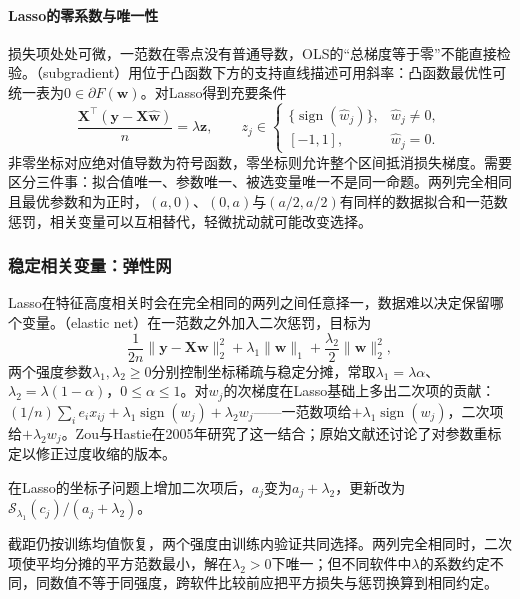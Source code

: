 \paragraph{Lasso的零系数与唯一性}

损失项处处可微，一范数在零点没有普通导数，OLS的“总梯度等于零”不能直接检验。（subgradient）用位于凸函数下方的支持直线描述可用斜率：凸函数最优性可统一表为$0\in\partial F(\bm{w})$。对Lasso得到充要条件
\begin{equation}
  \frac{\bm{X}^{\top}(\bm{y}-\bm{X}\widehat{\bm{w}})}{n}
  =\lambda\bm{z},\qquad
  z_j\in
  \begin{cases}
    \{\operatorname{sign}(\widehat w_j)\},&\widehat w_j\ne0,\\
    [-1,1],&\widehat w_j=0.
  \end{cases}
  \label{eq:regression-lasso-kkt}
\end{equation}
非零坐标对应绝对值导数为符号函数，零坐标则允许整个区间抵消损失梯度。需要区分三件事：拟合值唯一、参数唯一、被选变量唯一不是同一命题。两列完全相同且最优参数和为正时，$(a,0)$、$(0,a)$与$(a/2,a/2)$有同样的数据拟合和一范数惩罚，相关变量可以互相替代，轻微扰动就可能改变选择。

\subsubsection{稳定相关变量：弹性网}
\label{sec:regression-elastic-net}

Lasso在特征高度相关时会在完全相同的两列之间任意择一，数据难以决定保留哪个变量。（elastic net）在一范数之外加入二次惩罚，目标为
\[
  \frac{1}{2n}\lVert\bm{y}-\bm{X}\bm{w}\rVert_2^2
  +\lambda_1\lVert\bm{w}\rVert_1
  +\frac{\lambda_2}{2}\lVert\bm{w}\rVert_2^2,
\]
两个强度参数$\lambda_1,\lambda_2\geq0$分别控制坐标稀疏与稳定分摊，常取$\lambda_1=\lambda\alpha$、$\lambda_2=\lambda(1-\alpha)$，$0\leq\alpha\leq1$。对$w_j$的次梯度在Lasso基础上多出二次项的贡献：$(1/n)\sum_i e_i x_{ij}+\lambda_1\operatorname{sign}(w_j)+\lambda_2 w_j$——一范数项给$+\lambda_1\operatorname{sign}(w_j)$，二次项给$+\lambda_2 w_j$。Zou与Hastie在2005年研究了这一结合；原始文献还讨论了对参数重标定以修正过度收缩的版本。

在Lasso的坐标子问题上增加二次项后，$a_j$变为$a_j+\lambda_2$，更新改为$\mathcal{S}_{\lambda_1}(c_j)/(a_j+\lambda_2)$。

截距仍按训练均值恢复，两个强度由训练内验证共同选择。两列完全相同时，二次项使平均分摊的平方范数最小，解在$\lambda_2>0$下唯一；但不同软件中$\lambda$的系数约定不同，同数值不等于同强度，跨软件比较前应把平方损失与惩罚换算到相同约定。

